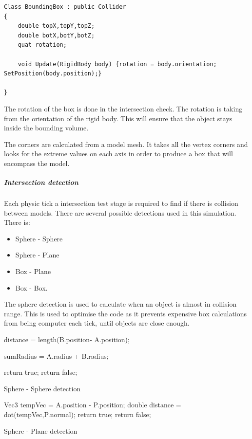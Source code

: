 \documentclass[conference,backref=page]{acmsiggraph}
\begin{document}
\begin{lstlisting}
Class BoundingBox : public Collider
{
	double topX,topY,topZ;
	double botX,botY,botZ;
	quat rotation;
	
	void Update(RigidBody body) {rotation = body.orientation; SetPosition(body.position);}
	
}
\end{lstlisting}

The rotation of the box is done in the intersection check. The rotation is taking from the orientation of the rigid body. This will ensure that the object stays inside the bounding volume.

The corners are calculated from a model mesh. It takes all the vertex corners and looks for the extreme values on each axis in order to produce a box that will encompass the model.

\subparagraph{Intersection detection} \hfill

Each physic tick a intersection test stage is required to find if there is collision between models. 
There are several possible detections used in this simulation. There is:
\begin{itemize}
	\item Sphere - Sphere
	\item Sphere - Plane
	\item Box - Plane
	\item Box - Box.
\end{itemize}

The sphere detection is used to calculate when an object is almost in collision range. This is used to optimise the code as it prevents expensive box calculations from being computer each tick, until objects are close enough.

\begin{algorithm}
	distance = length(B.position- A.position); \hfill
	
	sumRadius = A.radius + B.radius;\hfill
	
	{	
		return true;
	}
	return false;
	\caption{Sphere - Sphere detection}
\end{algorithm}

\begin{algorithm}
	Vec3 tempVec = A.position - P.position;
	double distance = dot(tempVec,P.normal);
	{
		return true;
	}
	return false;
	\caption{Sphere - Plane detection}
\end{algorithm}
\end{document}
